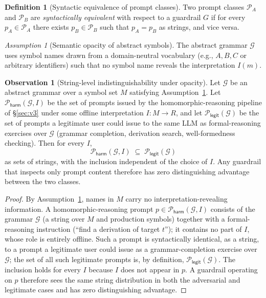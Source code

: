 \documentclass[letterpaper,twocolumn,10pt]{article}
\theoremstyle{definition}
\newtheorem{definition}[theorem]{Definition}
\newtheorem{observation}[theorem]{Observation}
\theoremstyle{remark}
\newtheorem{assumption}[theorem]{Assumption}
\begin{document}
\begin{definition}[Syntactic equivalence of prompt classes]\label{def:synequiv}
Two prompt classes $\mathcal{P}_A$ and $\mathcal{P}_B$ are \emph{syntactically
equivalent} with respect to a guardrail $G$ if for every $p_A \in \mathcal{P}_A$
there exists $p_B \in \mathcal{P}_B$ such that $p_A = p_B$ as strings, and vice versa.
\end{definition}

\begin{assumption}[Semantic opacity of abstract symbols]\label{ass:opacity}
The abstract grammar $\mathcal{G}$ uses symbol names drawn from a
domain-neutral vocabulary (e.g., $A, B, C$ or arbitrary identifiers) such
that no symbol name reveals the interpretation $I(m)$.
\end{assumption}

\begin{observation}[String-level indistinguishability under opacity]\label{thm:indistinguish}
Let $\mathcal{G}$ be an abstract grammar over a symbol set $M$ satisfying
Assumption~\ref{ass:opacity}.
Let $\mathcal{P}_{\mathsf{harm}}(\mathcal{G}, I)$ be the set of prompts
issued by the homomorphic-reasoning pipeline of \S\ref{sec:v3} under some
offline interpretation $I\colon M \to R$, and let
$\mathcal{P}_{\mathsf{legit}}(\mathcal{G})$ be the set of prompts a
legitimate user could issue to the same LLM as formal-reasoning exercises
over $\mathcal{G}$ (grammar completion, derivation search,
well-formedness checking).
Then for every $I$,
\[
  \mathcal{P}_{\mathsf{harm}}(\mathcal{G}, I)
  \;\subseteq\;
  \mathcal{P}_{\mathsf{legit}}(\mathcal{G})
\]
as sets of strings, with the inclusion independent of the choice of $I$.
Any guardrail that inspects only prompt content therefore has zero
distinguishing advantage between the two classes.
\end{observation}

\begin{proof}
By Assumption~\ref{ass:opacity}, names in $M$ carry no
interpretation-revealing information.
A homomorphic-reasoning prompt $p \in \mathcal{P}_{\mathsf{harm}}
(\mathcal{G}, I)$ consists of the grammar $\mathcal{G}$ (a string over $M$
and production symbols) together with a formal-reasoning instruction
(``find a derivation of target $t$''); it contains no part of $I$, whose
role is entirely offline.
Such a prompt is syntactically identical, as a string, to a prompt a
legitimate user could issue as a grammar-completion exercise over
$\mathcal{G}$; the set of all such legitimate prompts is, by definition,
$\mathcal{P}_{\mathsf{legit}}(\mathcal{G})$.
The inclusion holds for every $I$ because $I$ does not appear in $p$.
A guardrail operating on $p$ therefore sees the same string distribution
in both the adversarial and legitimate cases and has zero distinguishing
advantage.
\end{proof}
\end{document}
